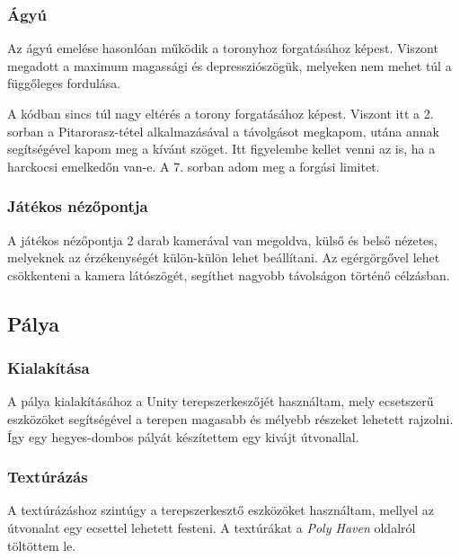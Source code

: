 \documentclass[
]{thesis-ekf}
\theoremstyle{definition}
\theoremstyle{remark}
\begin{document}
\subsubsection{Ágyú}

Az ágyú emelése hasonlóan működik a toronyhoz forgatásához képest. Viszont megadott a maximum magassági és depressziószögük, melyeken nem mehet túl a függőleges fordulása.



A kódban sincs túl nagy eltérés a torony forgatásához képest. Viszont itt a 2. sorban a Pitarorasz-tétel\cite{pitagorasz} alkalmazásával a távolgásot megkapom, utána annak segítségével kapom meg a kívánt szöget. Itt figyelembe kellet venni az is, ha a harckocsi emelkedőn van-e. A 7. sorban adom meg a forgási limitet.


\subsubsection{Játékos nézőpontja}

A játékos nézőpontja 2 darab kamerával van megoldva, külső és belső nézetes, melyeknek az érzékenységét külön-külön lehet beállítani. Az egérgörgővel lehet csökkenteni a  kamera látószögét, segíthet nagyobb távolságon történő célzásban.

\subsection{Pálya}

\subsubsection{Kialakítása}

A pálya kialakításához a Unity terepszerkeszőjét használtam, mely ecsetszerű eszközöket segítségével a terepen magasabb és mélyebb részeket lehetett rajzolni. Így egy hegyes-dombos pályát készítettem egy kivájt útvonallal.
\subsubsection{Textúrázás}

A textúrázáshoz szintúgy a terepszerkesztő eszközöket használtam, mellyel az útvonalat egy ecsettel lehetett festeni. A textúrákat a \emph{Poly Haven}\cite{polyhaven} oldalról töltöttem le.
\end{document}
